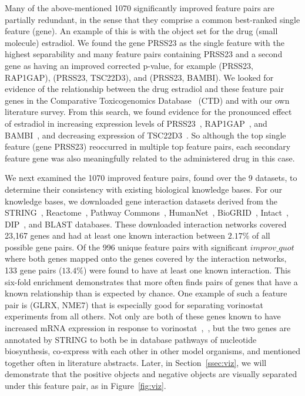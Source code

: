 Many of the above-mentioned 1070 significantly improved feature pairs are partially redundant, in the sense that they comprise a common best-ranked single feature (gene). An example of this is with the object set for the drug (small molecule) estradiol. We found the gene PRSS23 as the single feature with the highest separability and many feature pairs containing PRSS23 and a second gene as having an improved corrected p-value, for example (PRSS23, RAP1GAP), (PRSS23, TSC22D3), and (PRSS23, BAMBI). We looked for evidence of the relationship between the drug estradiol and these feature pair genes in the Comparative Toxicogenomics Database~\cite{grondin2018accessing} (CTD) and with our own literature survey. From this search, we found evidence for the pronounced effect of estradiol in increasing expression levels of PRSS23~\cite{chan2012serine}, RAP1GAP~\cite{moggs2004phenotypic}, and BAMBI~\cite{spink2009long}, and decreasing expression of TSC22D3~\cite{sengupta2013molecular}. So although the top single feature (gene PRSS23) reoccurred in multiple top feature pairs, each secondary feature gene was also meaningfully related to the administered drug in this case.

We next examined the 1070 improved feature pairs, found over the 9 \lincs datasets, to determine their consistency with existing biological knowledge bases. For our knowledge bases, we downloaded gene interaction datasets derived from the STRING~\cite{szklarczyk2014string}, Reactome~\cite{croft2013reactome}, Pathway Commons~\cite{cerami2010pathway}, HumanNet~\cite{lee2011prioritizing}, BioGRID~\cite{chatr2017biogrid}, Intact~\cite{orchard2013mintact}, DIP~\cite{salwinski2004database}, and BLAST databases. These downloaded interaction networks covered 23,167 genes and had at least one known interaction between $2.17\%$ of all possible gene pairs. Of the 996 unique feature pairs with significant $improv\_quot$ where both genes mapped onto the genes covered by the interaction networks, 133 gene pairs ($13.4\%$) were found to have at least one known interaction. This six-fold enrichment demonstrates that \genviz more often finds pairs of genes that have a known relationship than is expected by chance. One example of such a feature pair is (GLRX, NME7) that is especially good for separating vorinostat experiments from all others. Not only are both of these genes known to have increased mRNA expression in response to vorinostat~\cite{qi2014systematic},~\cite{soldi2013genomic}, but the two genes are annotated by STRING to both be in database pathways of nucleotide biosynthesis, co-express with each other in other model organisms, and mentioned together often in literature abstracts. Later, in Section~\ref{ssec:viz}, we will demonstrate that the positive objects and negative objects are visually separated under this feature pair, as in Figure~\ref{fig:viz}.

